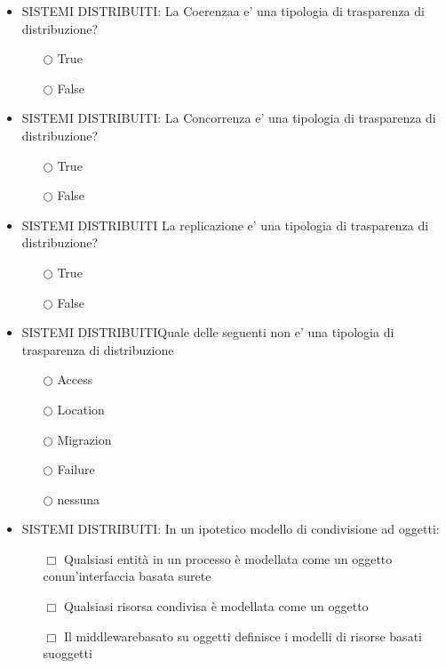 \documentclass[10pt,twocolumn]{article}
\begin{document}
\begin{itemize}
    \item SISTEMI DISTRIBUITI: La Coerenzaa e' una tipologia di trasparenza di distribuzione?
          \begin{itemize}
              \item[$\bigcirc$] True
              \item[$\bigcirc$] False
          \end{itemize}
\end{itemize}
\begin{itemize}
    \item SISTEMI DISTRIBUITI: La Concorrenza e' una tipologia di trasparenza di distribuzione?
          \begin{itemize}
              \item[$\bigcirc$] True
              \item[$\bigcirc$] False
          \end{itemize}
\end{itemize}
\begin{itemize}
    \item SISTEMI DISTRIBUITI La replicazione e' una tipologia di trasparenza di distribuzione?
          \begin{itemize}
              \item[$\bigcirc$] True
              \item[$\bigcirc$] False
          \end{itemize}
\end{itemize}
\begin{itemize}
    \item SISTEMI DISTRIBUITIQuale delle seguenti non e' una tipologia di trasparenza di distribuzione
          \begin{itemize}
              \item[$\bigcirc$] Access
              \item[$\bigcirc$] Location
              \item[$\bigcirc$] Migrazion
              \item[$\bigcirc$] Failure
              \item[$\bigcirc$] nessuna
          \end{itemize}
\end{itemize}
\begin{itemize}
    \item SISTEMI DISTRIBUITI: In un ipotetico modello di condivisione ad oggetti:
          \begin{itemize}
              \item[$\Box$] Qualsiasi entità in un processo è modellata come un oggetto conun'interfaccia basata surete
              \item[$\Box$] Qualsiasi risorsa condivisa è modellata come un oggetto
              \item[$\Box$] Il middlewarebasato su oggetti definisce i modelli di risorse basati suoggetti
          \end{itemize}
\end{itemize}
\end{document}
